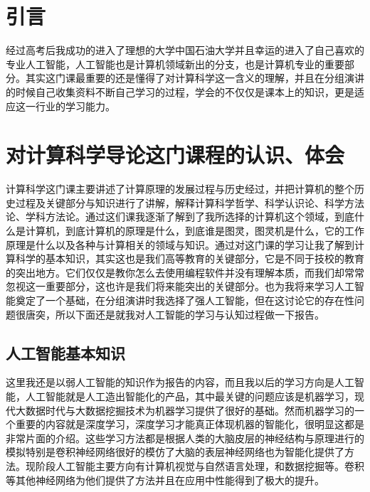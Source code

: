 \documentclass{article}
\begin{document}
\thispagestyle{empty}
\newpage
\setcounter{page}{1}
\section{引言}
经过高考后我成功的进入了理想的大学中国石油大学并且幸运的进入了自己喜欢的专业人工智能，人工智能也是计算机领域新出的分支，也是计算机专业的重要部分。其实这门课最重要的还是懂得了对计算科学这一含义的理解，并且在分组演讲的时候自己收集资料不断自己学习的过程，学会的不仅仅是课本上的知识，更是适应这一行业的学习能力。

\section{对计算科学导论这门课程的认识、体会}
计算科学这门课主要讲述了计算原理的发展过程与历史经过，并把计算机的整个历史过程及关键部分与知识进行了讲解，解释计算科学哲学、科学认识论、科学方法论、学科方法论。通过这们课我逐渐了解到了我所选择的计算机这个领域，到底什么是计算机，到底计算机的原理是什么，到底谁是图灵，图灵机是什么，它的工作原理是什么以及各种与计算相关的领域与知识。通过对这门课的学习让我了解到计算科学的基本知识，其实这也是我们高等教育的关键部分，它是不同于技校的教育的突出地方。它们仅仅是教你怎么去使用编程软件并没有理解本质，而我们却常常忽视这一重要部分，这也许是我们将来能突出的关键部分。也为我将来学习人工智能奠定了一个基础，在分组演讲时我选择了强人工智能，但在这讨论它的存在性问题很唐突，所以下面还是就我对人工智能的学习与认知过程做一下报告。\par
\subsection{人工智能基本知识}
这里我还是以弱人工智能的知识作为报告的内容，而且我以后的学习方向是人工智能，人工智能就是人工造出智能化的产品，其中最关键的问题应该是机器学习，现代大数据时代与大数据挖掘技术为机器学习提供了很好的基础。然而机器学习的一个重要的内容就是深度学习，深度学习才能真正体现机器的智能化，很明显这都是非常片面的介绍。这些学习方法都是根据人类的大脑皮层的神经结构与原理进行的模拟特别是卷积神经网络很好的模仿了大脑的表层神经网络也为智能化提供了方法。现阶段人工智能主要方向有计算机视觉与自然语言处理，和数据挖掘等。卷积等其他神经网络为他们提供了方法并且在应用中性能得到了极大的提升。\par
\end{document}

